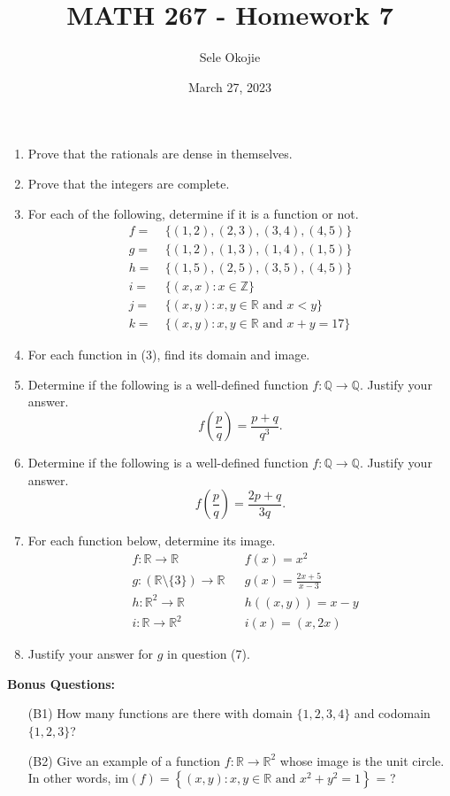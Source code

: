 \documentclass{article}
\title{MATH 267 - Homework 7}
\author{Sele Okojie}
\date{March 27, 2023}
\begin{document}
    \maketitle

    \begin{enumerate}
	\item Prove that the rationals are dense in themselves.
	\item Prove that the integers are complete.
	\item For each of the following, determine if it is a function or not.
		\begin{align*}
			f = & \ \{ (1, 2), (2, 3), (3, 4), (4, 5) \} \\
			g = & \ \{ (1, 2), (1, 3), (1, 4), (1, 5) \} \\
			h = & \ \{ (1, 5), (2, 5), (3, 5), (4, 5) \} \\
			i = & \ \{ (x,x) : x \in \mathbb{Z} \} \\
			j = & \ \{ (x,y) : x, y \in \mathbb{R} \text{ and } x < y \} \\
			k = & \ \{ (x,y) : x, y \in \mathbb{R} \text{ and } x + y = 17 \}
		\end{align*}
	\item For each function in (3), find its domain and image.
	\item Determine if the following is a well-defined function $f : \mathbb{Q} \rightarrow \mathbb{Q}$.  Justify your answer.
		\[
			f \left( \frac{p}{q} \right) = \frac{ p + q }{ q^3 }.
		\]
	\item Determine if the following is a well-defined function $f : \mathbb{Q} \rightarrow \mathbb{Q}$.  Justify your answer.
		\[
			f \left( \frac{p}{q} \right) = \frac{ 2p + q }{ 3q }.
		\]
	\item For each function below, determine its image.
		\begin{align*}
			& f : \mathbb{R} \rightarrow \mathbb{R} & & f(x) = x^2 \\
			& g : (\mathbb{R} \setminus \{ 3 \}) \rightarrow \mathbb{R} & & g(x) = \frac{2x + 5}{x - 3} \\
			& h : \mathbb{R}^2 \rightarrow \mathbb{R} & & h((x,y)) = x - y \\
			& i : \mathbb{R} \rightarrow \mathbb{R}^2 & & i(x) = (x, 2x) 
		\end{align*}
	\item Justify your answer for $g$ in question (7).
    \end{enumerate}

    \newpage
    \textbf{Bonus Questions:}
    
    \begin{itemize}
        \item [(B1)] How many functions are there with domain $\{ 1, 2, 3, 4 \}$ and codomain $\{ 1, 2, 3 \}$?
        \item [(B2)] Give an example of a function $f : \mathbb{R} \rightarrow \mathbb{R}^2$ whose image is the unit circle.  In other words, $\mathrm{im}(f) = \left\{ (x,y) : x, y \in \mathbb{R} \text{ and } x^2 + y^2 = 1 \right\}$ = ?
    \end{itemize}
\end{document}
